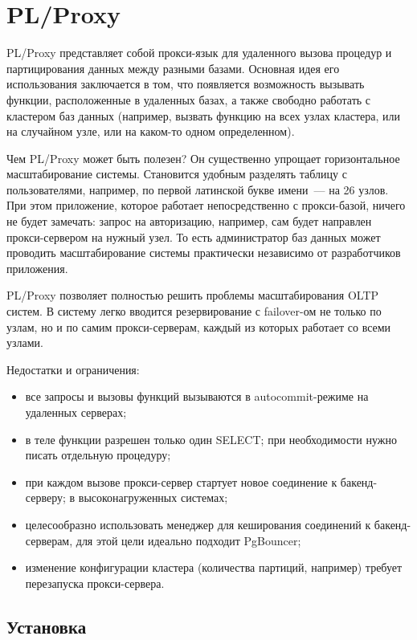 \section{PL/Proxy}
\label{sec:plproxy}

PL/Proxy представляет собой прокси-язык для удаленного вызова процедур и партицирования данных между разными базами. Основная идея его использования заключается в том, что появляется возможность вызывать функции, расположенные в удаленных базах, а также свободно работать с кластером баз данных (например, вызвать функцию на всех узлах кластера, или на случайном узле, или на каком-то одном определенном).

Чем PL/Proxy может быть полезен? Он существенно упрощает горизонтальное масштабирование системы. Становится удобным разделять таблицу с пользователями, например, по первой латинской букве имени~--- на 26 узлов. При этом приложение, которое работает непосредственно с прокси-базой, ничего не будет замечать: запрос на авторизацию, например, сам будет направлен прокси-сервером на нужный узел. То есть администратор баз данных может проводить масштабирование системы практически независимо от разработчиков приложения.

PL/Proxy позволяет полностью решить проблемы масштабирования OLTP систем. В систему легко вводится резервирование с failover-ом не только по узлам, но и по самим прокси-серверам, каждый из которых работает со всеми узлами.

Недостатки и ограничения:

\begin{itemize}
  \item все запросы и вызовы функций вызываются в autocommit-режиме на удаленных серверах;
  \item в теле функции разрешен только один SELECT; при необходимости нужно писать отдельную процедуру;
  \item при каждом вызове прокси-сервер стартует новое соединение к бакенд-серверу; в высоконагруженных системах;
  \item целесообразно использовать менеджер для кеширования соединений к бакенд-серверам, для этой цели идеально подходит PgBouncer;
  \item изменение конфигурации кластера (количества партиций, например) требует перезапуска прокси-сервера.
\end{itemize}


\subsection{Установка}

